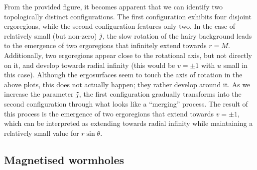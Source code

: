 \documentclass[aps,preprint,groupedaddress,nofootinbib,superscriptaddress,showkeys,showpacs,eqsecnum,amsmath,amssymb]{revtex4-1}
\begin{document}
From the provided figure, it becomes apparent that we can identify two topologically distinct configurations. The first configuration exhibits four disjoint ergoregions, while the second configuration features only two. In the case of relatively small (but non-zero) $\Tilde{\jmath}$, the slow rotation of the hairy background leads to the emergence of two ergoregions that infinitely extend towards $r=M$. Additionally, two ergoregions appear close to the rotational axis, but not directly on it, and develop towards radial infinity (this would be $v=\pm 1$ with $u$ small in this case). Although the ergosurfaces seem to touch the axis of rotation in the above plots, this does not actually happen; they rather develop around it. As we increase the parameter $\Tilde{\jmath}$, the first configuration gradually transforms into the second configuration through what looks like a ``merging'' process. The result of this process is the emergence of two ergoregions that extend towards $v=\pm 1$, which can be interpreted as extending towards radial infinity while maintaining a relatively small value for $r\sin\theta$.

\subsection{Magnetised wormholes}
\end{document}
